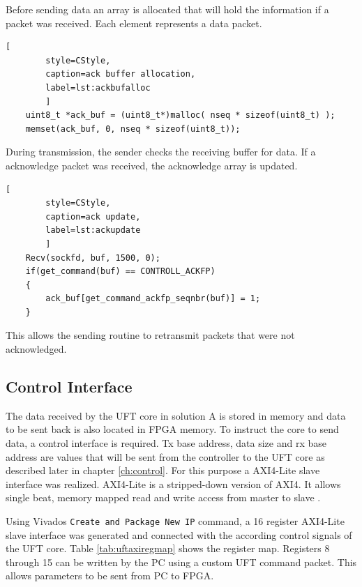 Before sending data an array is allocated that will hold the information if a
packet was received. Each element represents a data packet.

\begin{minipage}{\linewidth}
    \begin{lstlisting}[
        style=CStyle, 
        caption=ack buffer allocation, 
        label=lst:ackbufalloc
        ]
    uint8_t *ack_buf = (uint8_t*)malloc( nseq * sizeof(uint8_t) );
    memset(ack_buf, 0, nseq * sizeof(uint8_t));\end{lstlisting}
\end{minipage}

During transmission, the sender checks the receiving buffer for data. If a
acknowledge packet was received, the acknowledge array is updated.

\begin{minipage}{\linewidth}
    \begin{lstlisting}[
        style=CStyle, 
        caption=ack update, 
        label=lst:ackupdate
        ]
    Recv(sockfd, buf, 1500, 0);
    if(get_command(buf) == CONTROLL_ACKFP)
    {
        ack_buf[get_command_ackfp_seqnbr(buf)] = 1;
    }\end{lstlisting}
\end{minipage}

This allows the sending routine to retransmit packets that were not
acknowledged.

\subsection{Control Interface}
The data received by the UFT core in solution A is stored in memory and data to
be sent back
is also located in FPGA memory. To instruct the core to send data, a control
interface is required. Tx base address, data size and rx base address are values
that will be sent from the controller to the UFT core as described later in
chapter \ref{ch:control}. For this purpose a AXI4-Lite slave interface was
realized. AXI4-Lite is a stripped-down version of AXI4. It allows single beat,
memory mapped read and write access from master to slave \cite{axispecs}.

Using Vivados \texttt{Create and Package New IP} command, a 16 register
AXI4-Lite slave interface was generated and connected with the according control
signals of the UFT core. Table \ref{tab:uftaxiregmap} shows the register map.
Registers 8 through 15 can be written by the PC using a custom UFT command
packet. This allows parameters to be sent from PC to FPGA.

